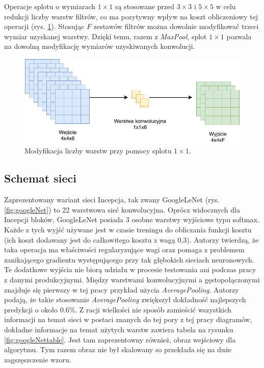 Operacje splotu o wymiarach \(1 \times 1\) są stosowane przed \(3 \times 3\) i \(5 \times 5\) w celu redukcji liczby warstw filtrów, co ma pozytywny wpływ na koszt obliczeniowy tej operacji (rys. \ref{fig:dlawik}).
Stosując \(F\) zestawów filtrów można dowolnie modyfikować trzeci wymiar uzyskanej warstwy. Dzięki temu, razem z \textit{MaxPool}, splot \(1 \times 1\) pozwala na dowolną modyfikację wymiarów uzyskiwanych konwolucji.

\begin{figure}[ht]
\centerline{\includegraphics[scale=1]{resources/dlawik.pdf}}
\caption{Modyfikacja liczby warstw przy pomocy splotu \(1 \times 1\).}
\label{fig:dlawik}
\end{figure}

\subsection{Schemat sieci}

Zaprezentowany wariant sieci Incepcja, tak zwany GoogleLeNet (rys. \ref{fig:googleNet}) to 22 warstwowa sieć konwolucyjna. Oprócz widocznych dla Incepcji bloków, GoogleLeNet posiada 3 osobne warstwy
wyjściowe typu softmax. Każde z tych wyjść używane jest w czasie treningu do obliczania funkcji kosztu (ich koszt dodawany jest do całkowitego kosztu z wagą 0,3).
Autorzy twierdzą, że taka operacja ma właściwości regularyzujące wagi oraz pomaga z problemem zanikającego gradientu występującego przy tak głębokich sieciach neuronowych.
Te dodatkowe wyjścia nie biorą udziału w procesie testowania ani podczas pracy z danymi produkcyjnymi.
Między warstwami konwolucyjnymi a gęstopołączonymi znajduje się pierwszy w tej pracy przykład użycia \textit{AveragePooling}. Autorzy podają, że takie stosowanie \textit{AveragePooling} zwiększył dokładność najlepszych predykcji o około 0.6\%.
Z racji wielkości nie sposób zamieścić wszystkich informacji na temat sieci w postaci znanych do tej pory z tej pracy diagramów, dokładne informacje na temat użytych warstw zawiera tabela na rysunku \ref{fig:googleNettable}. Jest tam zaprezentowny również, obraz wejściowy dla algorytmu. Tym razem obraz nie był skalowany so przekłada się na duże zagszęszczenie wzoru.

